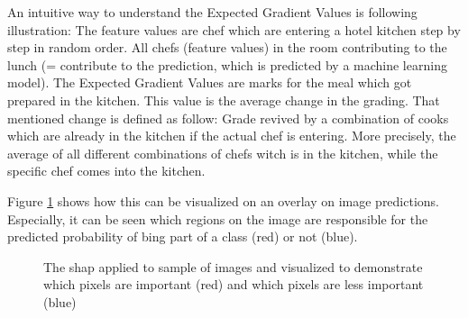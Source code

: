 An intuitive way to understand the Expected Gradient Values is following illustration: The feature values are chef which are entering a hotel kitchen step by step in random order. All chefs (feature values) in the room contributing to the lunch (= contribute to the prediction, which is predicted by a machine learning model). The Expected Gradient Values are marks for the meal which got prepared in the kitchen. This value is the average change in the grading. That mentioned change is defined as follow: Grade revived by a combination of cooks which are already in the kitchen if the actual chef is entering. More precisely, the average of all different combinations of chefs witch is in the kitchen, while the specific chef comes into the kitchen. 

Figure \ref{fig:gradient_imagenet_plot} shows how this can be visualized on an overlay on image predictions. Especially, it can be seen which regions on the image are responsible for the predicted probability of bing part of a class (red) or not (blue). 

\begin{figure}[htp]
	\centering
	\caption{The shap applied to sample of images and visualized to demonstrate which pixels are important (red) and which pixels are less important (blue) \cite{shaoshan91:online}}
	\label{fig:gradient_imagenet_plot}
\end{figure}

